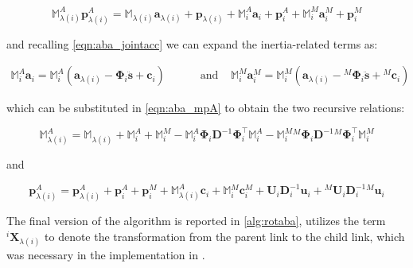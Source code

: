 \begin{equation}
    \label{eqn:aba_mpA}
    \mathbb{M} _{\lambda(i)} ^A \mathbf{p} _{\lambda(i)} ^A = \mathbb{M} _{\lambda (i)} \mathbf{a} _{\lambda (i)} + \mathbf{p} _{\lambda (i)} + \mathbb{M} _i ^A \mathbf{a} _i + \mathbf{p} _i ^A + \mathbb{M} _i ^M \mathbf{a} _i ^M + \mathbf{p} _i ^M
\end{equation}

and recalling \cref{eqn:aba_jointacc} we can expand the inertia-related terms as:

\begin{align}
    \mathbb{M} _i ^A \mathbf{a} _i = \mathbb{M} _i ^A (\mathbf{a} _{\lambda (i)} - \boldsymbol{\Phi} _i \ddot{\mathbf{s}} + \mathbf{c}_i) & \qquad \text{ and } & \mathbb{M} _i ^M \mathbf{a} _i ^M = \mathbb{M} _i ^M (\mathbf{a} _{\lambda (i)} - {} ^M \boldsymbol{\Phi} _i \ddot{\mathbf{s}} + {} ^M \mathbf{c}_i)
\end{align}

which can be substituted in \cref{eqn:aba_mpA} to obtain the two recursive relations:

\begin{equation}
    \mathbb{M} _{\lambda(i)} ^A = \mathbb{M} _{\lambda (i)} + \mathbb{M} _i ^A + \mathbb{M} _i ^M - \mathbb{M} _i ^A \boldsymbol{\Phi} _i \mathbf{D}^{-1} \boldsymbol{\Phi} _i ^\top  \mathbb{M} _i ^A - \mathbb{M} _i ^M {} ^M \boldsymbol{\Phi} _i \mathbf{D}^{-1} {} ^M \boldsymbol{\Phi} _i ^\top  \mathbb{M} _i ^M
\end{equation}

and

\begin{equation}
    \mathbf{p} ^A _{\lambda (i)} = \mathbf{p} ^A _{\lambda (i)} + \mathbf{p} ^A_i + \mathbf{p} ^M_i  + \mathbb{M} ^A _{\lambda (i)}  \mathbf{c}_i + \mathbb{M} {} ^M _i \mathbf{c} ^M _i + {}  \mathbf{U} _i \mathbf{D} ^{-1} _i {} \mathbf{u} _i + {} ^M \mathbf{U} _i \mathbf{D} ^{-1} _i {} ^M\mathbf{u} _i
\end{equation}

The final version of the algorithm is reported in \cref{alg:rotaba}, utilizes the term  ${}^i\mathbf{X} _{\lambda (i)}$ to denote the transformation from the parent link to the child link, which was necessary in the implementation in \jaxsim.

